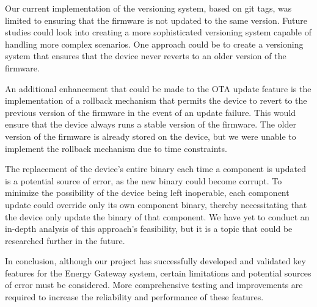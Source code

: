 Our current implementation of the versioning system, based on git tags, was limited to ensuring that the firmware is not updated to the same version. Future studies could look into creating a more sophisticated versioning system capable of handling more complex scenarios. One approach could be to create a versioning system that ensures that the device never reverts to an older version of the firmware.

An additional enhancement that could be made to the OTA update feature is the implementation of a rollback mechanism that permits the device to revert to the previous version of the firmware in the event of an update failure. This would ensure that the device always runs a stable version of the firmware. The older version of the firmware is already stored on the device, but we were unable to implement the rollback mechanism due to time constraints.

The replacement of the device's entire binary each time a component is updated is a potential source of error, as the new binary could become corrupt. To minimize the possibility of the device being left inoperable, each component update could override only its own component binary, thereby necessitating that the device only update the binary of that component. We have yet to conduct an in-depth analysis of this approach's feasibility, but it is a topic that could be researched further in the future.

In conclusion, although our project has successfully developed and validated key features for the Energy Gateway system, certain limitations and potential sources of error must be considered. More comprehensive testing and improvements are required to increase the reliability and performance of these features.